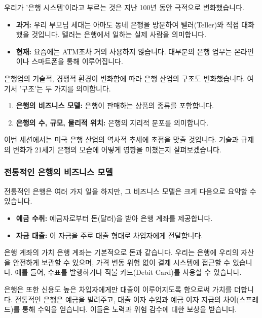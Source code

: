 \documentclass[11pt,a4paper]{article}
\theoremstyle{definition}
\begin{document}
우리가 '은행 시스템'이라고 부르는 것은 지난 100년 동안 극적으로 변화했습니다.

\begin{itemize}
    \item \textbf{과거:} 우리 부모님 세대는 아마도 동네 은행을 방문하여 텔러(Teller)와 직접 대화했을 것입니다. 텔러는 은행에서 일하는 실제 사람을 의미합니다.
    \item \textbf{현재:} 요즘에는 ATM조차 거의 사용하지 않습니다. 대부분의 은행 업무는 온라인이나 스마트폰을 통해 이루어집니다.
\end{itemize}

은행업의 기술적, 경쟁적 환경이 변화함에 따라 은행 산업의 구조도 변화했습니다. 여기서 '구조'는 두 가지를 의미합니다.
\begin{enumerate}
    \item \textbf{은행의 비즈니스 모델:} 은행이 판매하는 상품의 종류를 포함합니다.
    \item \textbf{은행의 수, 규모, 물리적 위치:} 은행의 지리적 분포를 의미합니다.
\end{enumerate}
이번 세션에서는 미국 은행 산업의 역사적 추세에 초점을 맞출 것입니다. 기술과 규제의 변화가 21세기 은행의 모습에 어떻게 영향을 미쳤는지 살펴보겠습니다.

\subsubsection*{전통적인 은행의 비즈니스 모델}
전통적인 은행은 여러 가지 일을 하지만, 그 비즈니스 모델은 크게 다음으로 요약할 수 있습니다.
\begin{itemize}
    \item \textbf{예금 수취:} 예금자로부터 돈(달러)을 받아 은행 계좌를 제공합니다.
    \item \textbf{자금 대출:} 이 자금을 주로 대출 형태로 차입자에게 전달합니다.
\end{itemize}

\begin{examplebox}{은행 계좌의 가치}
은행 계좌는 기본적으로 돈과 같습니다. 우리는 은행에 우리의 자산을 안전하게 보관할 수 있으며, 가격 변동 위험 없이 결제 시스템에 접근할 수 있습니다. 예를 들어, 수표를 발행하거나 직불 카드(Debit Card)를 사용할 수 있습니다.
\end{examplebox}

은행은 또한 신용도 높은 차입자에게만 대출이 이루어지도록 함으로써 가치를 더합니다. 전통적인 은행은 예금을 빌려주고, 대출 이자 수입과 예금 이자 지급의 차이(스프레드)를 통해 수익을 얻습니다. 이들은 노력과 위험 감수에 대한 보상을 받습니다.
\end{document}

